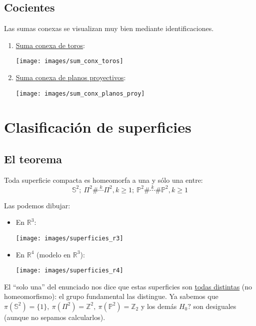 \section{Cocientes}%
\label{sec:cocientes_sum_conx}
Las sumas conexas se visualizan muy bien mediante identificaciones.
\begin{enumerate}
    \item \underline{Suma conexa de toros}: 
    \begin{center}
        \texttt{[image: images/sum\_conx\_toros]} 
    \end{center}

    \item \underline{Suma conexa de planos proyectivos}:
    \begin{center}
        \texttt{[image: images/sum\_conx\_planos\_proy]} 
    \end{center}
\end{enumerate}


\chapter{Clasificación de superficies}%
\label{cha:clasificacion_de_superficies}
\section{El teorema}%
\label{sec:el_teorema}
\begin{theo}
Toda superficie compacta es homeomorfa a una y sólo una entre:
\[
\mathbb{S}^{2};\ \Pi^2 \# \stackrel{k}{\cdots} \Pi^2, k\ge 1;\ \mathbb{P}^{2} \# \stackrel{k}{\cdots} \# \mathbb{P}^{2}, k\ge 1 
\]
\end{theo}
Las podemos dibujar:
\begin{itemize}
    \item En $\mathbb{R}^{3}$:
    \begin{center}
        \texttt{[image: images/superficies\_r3]} 
    \end{center}
    \item En $\mathbb{R}^{4}$ (modelo en $\mathbb{R}^{3}$):
    \begin{center}
        \texttt{[image: images/superficies\_r4]} 
    \end{center}
\end{itemize}
El ``solo una'' del enunciado nos dice que estas superficies son \underline{todas distintas} (no homeomorfismo): el grupo fundamental las distingue. Ya sabemos que $\pi\left( \mathbb{S}^{2} \right) = \{1\},\ \pi\left( \Pi^2 \right) = \mathbb{Z}^2,\ \pi\left( \mathbb{P}^{2} \right) = \mathbb{Z}_2$ y los demás $H_0?$ son desiguales (aunque no sepamos calcularlos).

